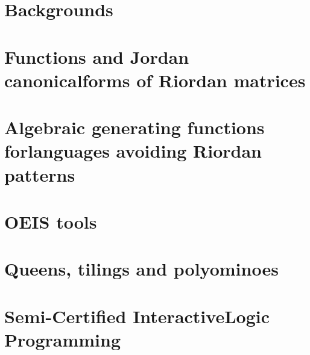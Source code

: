 \documentclass[a4paper]{tufte-book}
\begin{document}
\blankpage



\maketitle



\tableofcontents

\listoftables



\cleardoublepage

\chapter{Backgrounds}
\label{ch:backgrounds}

\chapter{Functions and Jordan canonical\newline forms of Riordan matrices}
\label{ch:Riordan-matrices-function}



\chapter{Algebraic generating functions for\newline languages avoiding Riordan patterns}
\label{ch:algebraic-gfs-languages-avoiding-Riordan-patterns}



\chapter{OEIS tools}
\label{ch:OEIS:tools}



\chapter{Queens, tilings and polyominoes}
\label{ch:queens-tilings-polyominoes}



\chapter{Semi-Certified Interactive\newline Logic Programming} 
\label{ch:scilp}






\printindex
\end{document}
